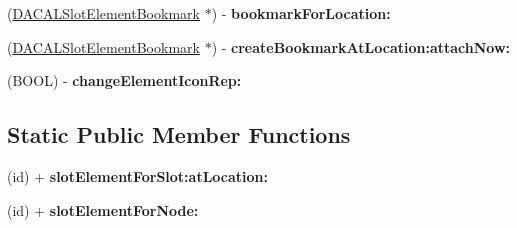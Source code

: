 \begin{DoxyCompactItemize}
\item 
\hypertarget{interface_d_a_c_a_l_slot_element_a6ee805504081add2911cf3e07bb7a32b}{
(\hyperlink{interface_d_a_c_a_l_slot_element_bookmark}{DACALSlotElementBookmark} $\ast$) -\/ {\bfseries bookmarkForLocation:}}
\label{interface_d_a_c_a_l_slot_element_a6ee805504081add2911cf3e07bb7a32b}

\item 
\hypertarget{interface_d_a_c_a_l_slot_element_a289bb58f9dbda4f17f07216e908f4fe2}{
(\hyperlink{interface_d_a_c_a_l_slot_element_bookmark}{DACALSlotElementBookmark} $\ast$) -\/ {\bfseries createBookmarkAtLocation:attachNow:}}
\label{interface_d_a_c_a_l_slot_element_a289bb58f9dbda4f17f07216e908f4fe2}

\item 
\hypertarget{interface_d_a_c_a_l_slot_element_a331d0110a57fb8359d7b16bbe01e486c}{
(BOOL) -\/ {\bfseries changeElementIconRep:}}
\label{interface_d_a_c_a_l_slot_element_a331d0110a57fb8359d7b16bbe01e486c}

\end{DoxyCompactItemize}
\subsection*{Static Public Member Functions}
\begin{DoxyCompactItemize}
\item 
\hypertarget{interface_d_a_c_a_l_slot_element_a12d6782b3fabf9cea3ffc6d84a81c936}{
(id) + {\bfseries slotElementForSlot:atLocation:}}
\label{interface_d_a_c_a_l_slot_element_a12d6782b3fabf9cea3ffc6d84a81c936}

\item 
\hypertarget{interface_d_a_c_a_l_slot_element_a0ad936922137302c2604a4bb0e382ae0}{
(id) + {\bfseries slotElementForNode:}}
\label{interface_d_a_c_a_l_slot_element_a0ad936922137302c2604a4bb0e382ae0}

\end{DoxyCompactItemize}
